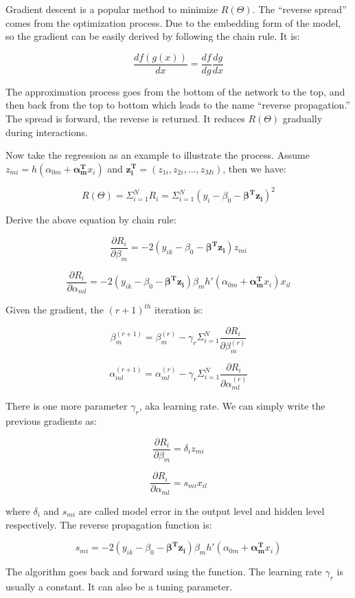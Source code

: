 \documentclass[]{book}
\theoremstyle{definition}
\theoremstyle{definition}
\theoremstyle{remark}
\begin{document}
Gradient descent is a popular method to minimize \(R(\Theta)\). The
``reverse spread'' comes from the optimization process. Due to the
embedding form of the model, so the gradient can be easily derived by
following the chain rule. It is:

\[\frac{df(g(x))}{dx}=\frac{df}{dg}\frac{dg}{dx}\]

The approximation process goes from the bottom of the network to the
top, and then back from the top to bottom which leads to the name
``reverse propagation.'' The spread is forward, the reverse is returned.
It reduces \(R(\Theta)\) gradually during interactions.

Now take the regression as an example to illustrate the process. Assume
\(z_{mi}=h(\alpha_{0m}+\mathbf{\alpha_{m}^{T}}x_{i})\) and
\(\mathbf{z_{i}^{T}}=(z_{1i},z_{2i},\dots,z_{Mi})\), then we have:

\[R(\Theta)=\Sigma_{i=1}^{N}R_{i}=\Sigma_{i=1}^{N}(y_{i}-\beta_{0}-\mathbf{\beta^{T}z_{i}})^{2}\]

Derive the above equation by chain rule:

\[\frac{\partial R_{i}}{\partial\beta_{m}}=-2(y_{ik}-\beta_{0}-\mathbf{\mathbf{\beta}^{T}z_{i}})z_{mi}\]

\[\frac{\partial R_{i}}{\partial\alpha_{ml}}=-2(y_{ik}-\beta_{0}-\mathbf{\mathbf{\beta}^{T}z_{i}})\beta_{m}h'(\alpha_{0m}+\mathbf{\alpha_{m}^{T}}x_{i})x_{il}\]

Given the gradient, the \((r+1)^{th}\) iteration is:

\[\beta_{m}^{(r+1)}=\beta_{m}^{(r)}-\gamma_{r}\Sigma_{i=1}^{N}\frac{\partial R_{i}}{\partial\beta_{m}^{(r)}}\]

\[\alpha_{ml}^{(r+1)}=\alpha_{ml}^{(r)}-\gamma_{r}\Sigma_{i=1}^{N}\frac{\partial R_{i}}{\partial\alpha_{ml}^{(r)}}\]

There is one more parameter \(\gamma_{r}\), aka learning rate. We can
simply write the previous gradients as:

\[\frac{\partial R_{i}}{\partial\beta_{m}}=\delta_{i}z_{mi}\]

\[\frac{\partial R_{i}}{\partial\alpha_{ml}}=s_{mi}x_{il}\]

where \(\delta_{i}\) and \(s_{mi}\) are called model error in the output
level and hidden level respectively. The reverse propagation function
is:

\[s_{mi}=-2(y_{ik}-\beta_{0}-\mathbf{\mathbf{\beta}^{T}z_{i}})\beta_{m}h'(\alpha_{0m}+\mathbf{\alpha_{m}^{T}}x_{i})\]

The algorithm goes back and forward using the function. The learning
rate \(\gamma_{r}\) is usually a constant. It can also be a tuning
parameter.
\end{document}
